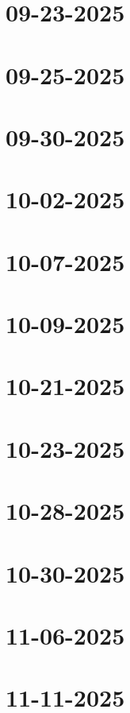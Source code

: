 \documentclass[]{mangos-musings}
\begin{document}
\newpage
\section{09-23-2025}

\newpage
\section{09-25-2025}

\newpage
\section{09-30-2025}

\newpage
\section{10-02-2025}

\newpage
\section{10-07-2025}

\newpage
\section{10-09-2025}

\newpage
\section{10-21-2025}

\newpage
\section{10-23-2025}

\newpage
\section{10-28-2025}

\newpage
\section{10-30-2025}

\newpage
\section{11-06-2025}

\newpage
\section{11-11-2025}
\end{document}
